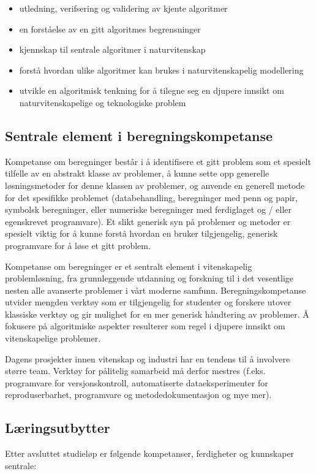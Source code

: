 \documentclass{article}
\begin{document}
\begin{itemize}
  \item utledning, verifsering og validering av kjente algoritmer
  \item en forståelse av en gitt algoritmes begrensninger
  \item kjennskap til sentrale algoritmer i naturvitenskap
  \item forstå hvordan ulike algoritmer kan brukes i naturvitenskapelig modellering
  \item utvikle en algoritmisk tenkning for å tilegne seg en djupere innsikt om naturvitenskapelige og teknologiske problem
\end{itemize}

\subsection{Sentrale element i beregningskompetanse}
Kompetanse om beregninger består i å identifisere et gitt problem som et spesielt tilfelle av en abstrakt klasse av problemer, å kunne sette opp generelle løsningsmetoder for denne klassen av problemer, og anvende en generell metode for det spesifikke problemet (databehandling, beregninger med penn og papir, symbolsk beregninger, eller
numeriske beregninger med ferdiglaget og / eller egenskrevet programvare). Et slikt 
generisk syn på problemer og metoder er spesielt viktig for
å kunne forstå hvordan en bruker tilgjengelig, generisk programvare for å løse et gitt problem.

Kompetanse om beregninger er et sentralt element
i vitenskapelig problemløsning, fra grunnleggende utdanning og forskning til
i det vesentlige nesten alle avanserte problemer i vårt moderne
samfunn. Beregningskompetanse  utvider mengden verktøy som er tilgjengelig for studenter og
forskere utover klassiske verktøy og gir mulighet for en mer generisk
håndtering av problemer. Å fokusere på algoritmiske aspekter resulterer som regel i
djupere innsikt om vitenskapelige problemer.

Dagens prosjekter innen vitenskap og industri har en tendens til å involvere større team. Verktøy for pålitelig samarbeid må derfor mestres (f.eks. programvare for versjonskontroll, automatiserte dataeksperimenter for reproduserbarhet, programvare og metodedokumentasjon og mye mer).

\subsection{Læringsutbytter }
Etter avsluttet studieløp er følgende kompetanser, ferdigheter og kunnskaper sentrale:
\end{document}
